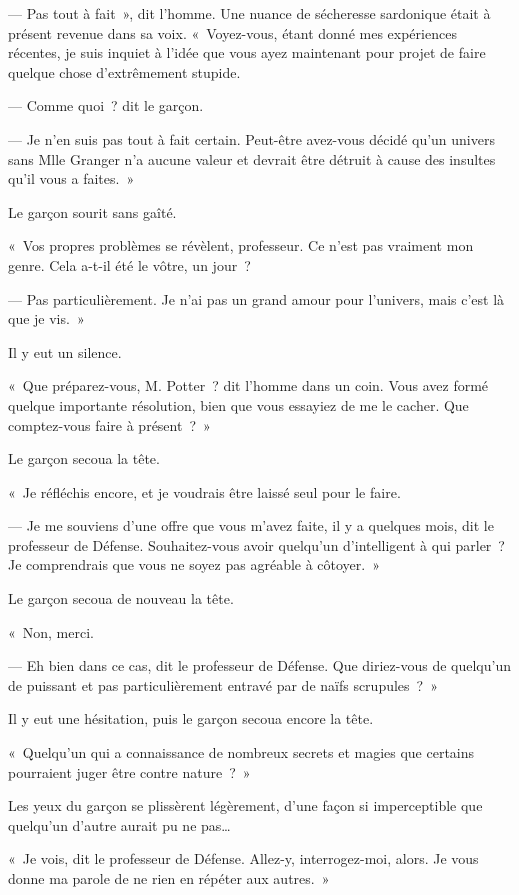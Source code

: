 --- Pas tout à fait~», dit l'homme. Une nuance de sécheresse sardonique était à présent revenue dans sa voix. «~Voyez-vous, étant donné mes expériences récentes, je suis inquiet à l'idée que vous ayez maintenant pour projet de faire quelque chose d'extrêmement stupide.

--- Comme quoi~? dit le garçon.

--- Je n'en suis pas tout à fait certain. Peut-être avez-vous décidé qu'un univers sans Mlle Granger n'a aucune valeur et devrait être détruit à cause des insultes qu'il vous a faites.~»

Le garçon sourit sans gaîté.

«~Vos propres problèmes se révèlent, professeur. Ce n'est pas vraiment mon genre. Cela a-t-il été le vôtre, un jour~?

--- Pas particulièrement. Je n'ai pas un grand amour pour l'univers, mais c'est là que je vis.~»

Il y eut un silence.

«~Que préparez-vous, M. Potter~? dit l'homme dans un coin. Vous avez formé quelque importante résolution, bien que vous essayiez de me le cacher. Que comptez-vous faire à présent~?~»

Le garçon secoua la tête.

«~Je réfléchis encore, et je voudrais être laissé seul pour le faire.

--- Je me souviens d'une offre que vous m'avez faite, il y a quelques mois, dit le professeur de Défense. Souhaitez-vous avoir quelqu'un d'intelligent à qui parler~? Je comprendrais que vous ne soyez pas agréable à côtoyer.~»

Le garçon secoua de nouveau la tête.

«~Non, merci.

--- Eh bien dans ce cas, dit le professeur de Défense. Que diriez-vous de quelqu'un de puissant et pas particulièrement entravé par de naïfs scrupules~?~»

Il y eut une hésitation, puis le garçon secoua encore la tête.

«~Quelqu'un qui a connaissance de nombreux secrets et magies que certains pourraient juger être contre nature~?~»

Les yeux du garçon se plissèrent légèrement, d'une façon si imperceptible que quelqu'un d'autre aurait pu ne pas…

«~Je vois, dit le professeur de Défense. Allez-y, interrogez-moi, alors. Je vous donne ma parole de ne rien en répéter aux autres.~»

